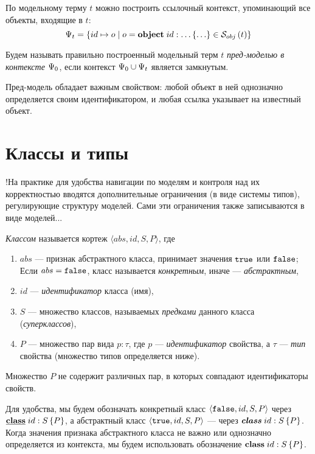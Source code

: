 По модельному терму $t$ можно построить ссылочный контекст, упоминающий все объекты, входящие в $t$:
$$
	\Psi_t = \left\{ id \mapsto o \;|\; o = \mathbf{object}\;id : \ldots\left\{ \ldots \right\} \in \mathcal{S}_{obj}\left(t\right)\right\}
$$

\begin{Def}
Будем называть правильно построенный модельный терм $t$ \emph{пред-моделью в контексте $\Psi_0$}, если контекст $\Psi_0 \cup \Psi_t$ является замкнутым.
\end{Def}

Пред-модель обладает важным свойством: любой объект в ней однозначно определяется своим идентификатором, и любая ссылка указывает на известный объект.

\section{Классы и типы}

!На практике для удобства навигации по моделям и контроля над их корректностью вводятся дополнительные ограничения (в виде системы типов), регулирующие структуру моделей. Сами эти ограничения также записываются в виде моделей...

\begin{Def}[Класс]
\emph{Классом} называется кортеж $\langle abs, id, S, P \rangle$, где 
\begin{enumerate}
\item $abs$ --- признак абстрактного класса, принимает значения $\mathtt{true}$ или $\mathtt{false}$; Если $abs = \mathtt{false}$, класс называется \emph{конкретным}, иначе --- \emph{абстрактным},
\item $id$ --- \emph{идентификатор} класса (имя),
\item $S$ --- множество классов, называемых \emph{предками} данного класса (\emph{суперклассов}),
\item $P$ --- множество пар вида $p : \tau$, где $p$ --- \emph{идентификатор} свойства, а $\tau$ --- \emph{тип} свойства (множество типов определяется ниже).
\end{enumerate}
Множество $P$ не содержит различных пар, в которых совпадают идентификаторы свойств.
\end{Def}

Для удобства, мы будем обозначать конкретный класс $\langle \mathtt{false}, id, S, P \rangle$ через \mbox{$\underline{\mathbf{class}}\;id : S \left\{P\right\}$}, а абстрактный класс $\langle \mathtt{true}, id, S, P \rangle$ --- через \mbox{$\mbox{\textbf{\textit{class}}}\;id : S \left\{P\right\}$}. Когда значения признака абстрактного класса не важно или однозначно определяется из контекста, мы будем использовать обозначение \mbox{$\mathbf{class}\;id : S \left\{P\right\}$}.

